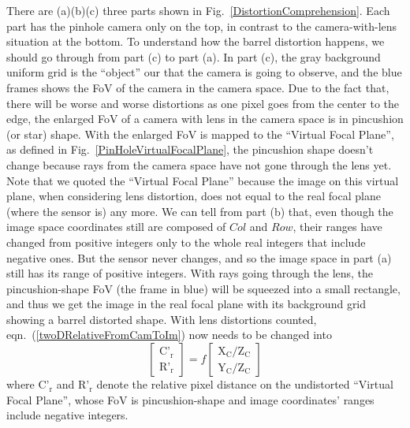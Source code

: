 There are (a)(b)(c) three parts shown in Fig.~\ref{DistortionComprehension}. Each part has the pinhole camera only on the top, in contrast to the camera-with-lens situation at the bottom. To understand how the barrel distortion happens, we should go through from part (c) to part (a). In part (c), the gray background uniform grid is the \enquote{object} our that the camera is going to observe, and the blue frames shows the FoV of the camera in the camera space. Due to the fact that, there will be worse and worse distortions as one pixel goes from the center to the edge, the enlarged FoV of a camera with lens in the camera space is in pincushion (or star) shape. With the enlarged FoV is mapped to the \enquote{Virtual Focal Plane}, as defined in Fig.~\ref{PinHoleVirtualFocalPlane}, the pincushion shape doesn't change because rays from the camera space have not gone through the lens yet. Note that we quoted the \enquote{Virtual Focal Plane} because the image on this virtual plane, when considering lens distortion, does not equal to the real focal plane (where the sensor is) any more. We can tell from part (b) that, even though the image space coordinates still are composed of \(Col\) and \(Row\), their ranges have changed from positive integers only to the whole real integers that include negative ones. But the sensor never changes, and so the image space in part (a) still has its range of positive integers. With rays going through the lens, the pincushion-shape FoV (the frame in blue) will be squeezed into a small rectangle, and thus we get the image in the real focal plane with its background grid showing a barrel distorted shape. %
With lens distortions counted, eqn.~(\ref{twoDRelativeFromCamToIm}) now needs to be changed into 
%
\begin{equation}
\left[ \begin{array}{c} \text{C'}_\text{r} \\ \text{R'}_\text{r} \end{array} \right] %
= f %
\left[ \begin{array}{c} \text{X}_\text{C}/\text{Z}_\text{C} \\ \text{Y}_\text{C}/\text{Z}_\text{C} \end{array} \right]%
\label{undistortedRelativeFromCamToIm}
\end{equation}
where \(\text{C'}_\text{r}\) and \(\text{R'}_\text{r}\) denote the relative pixel distance on the undistorted \enquote{Virtual Focal Plane}, whose FoV is pincushion-shape and image coordinates' ranges include negative integers.%
